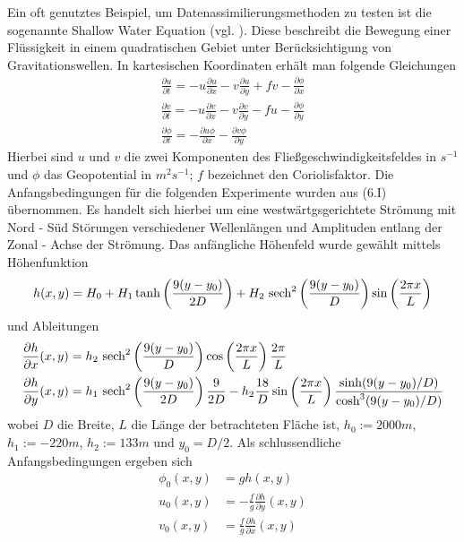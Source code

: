 Ein oft genutztes Beispiel, um Datenassimilierungsmethoden zu testen ist die sogenannte Shallow Water Equation (vgl. \cite{zou,navon}). Diese beschreibt die Bewegung einer Flüssigkeit in einem quadratischen Gebiet unter Berücksichtigung von Gravitationswellen. In kartesischen Koordinaten erhält man folgende Gleichungen
\begin{equation}
\begin{aligned}
 \frac{\partial u }{\partial t} = -u\frac{\partial u}{\partial x} -v\frac{\partial u}{\partial y} + fv - \frac{\partial \phi}{\partial x}\\
 \frac{\partial v }{\partial t} = -u\frac{\partial v}{\partial x} -v\frac{\partial v}{\partial y} - fu - \frac{\partial \phi}{\partial y}\\
 \frac{\partial \phi }{\partial t} = -\frac{\partial u\phi}{\partial x} -\frac{\partial v\phi}{\partial y} 
\end{aligned}
\label{eq:swe}
 \end{equation}
Hierbei sind $u$ und $v$ die zwei Komponenten des Fließgeschwindigkeitsfeldes in $s^{-1}$ und $\phi$ das Geopotential in $m^2 s^{-1}$; 
$f$ bezeichnet den Coriolisfaktor.
Die Anfangsbedingungen für die folgenden Experimente wurden aus \cite{grammeltvedt}(6.I) übernommen. Es handelt sich hierbei um eine westwärtgsgerichtete Strömung mit Nord - Süd Störungen verschiedener Wellenlängen und Amplituden entlang der Zonal - Achse der Strömung. Das anfängliche Höhenfeld wurde gewählt mittels Höhenfunktion
\begin{align*}
 h(x,y) = H_0 + H_1 \tanh \left( \frac{9(y-y_0)}{2D}\right) + H_2 ~\text{sech}^2\left(\frac{9(y-y_0)}{D}\right) \sin\left(\frac{2\pi x}{L}\right)
\end{align*}
und Ableitungen
\begin{align*}
 \frac{\partial h}{\partial x}(x,y) &= h_2~\text{sech}^2\left( \frac{9(y-y_0)}{D}\right) \cos\left( \frac{2\pi x}{L} \right)\frac{2\pi}{L} \\
 \frac{\partial h}{\partial y}(x,y) &= h_1 ~\text{sech}^2\left( \frac{9(y-y_0)}{2D}\right)\frac{9}{2D} -  h_2\frac{18}{D} \sin\left( \frac{2\pi x}{L}\right) \frac{\sinh(9(y-y_0)/D)}{\cosh^3(9(y-y_0)/D)}\\
\end{align*}
wobei $D$ die Breite, $L$ die Länge der betrachteten Fläche ist,  $h_0 := 2000m$, $h_1 := -220m$, $h_2 := 133m$ und $y_0 = D/2$. Als schlussendliche Anfangsbedingungen ergeben sich
\begin{align*}
 \phi_0(x,y) &= gh(x,y)\\
 u_0(x,y) &= -\frac{f}{g} \frac{\partial h}{\partial y}(x,y)\\
 v_0(x,y) &= \frac{f}{g} \frac{\partial h}{\partial x}(x,y)
\end{align*}
